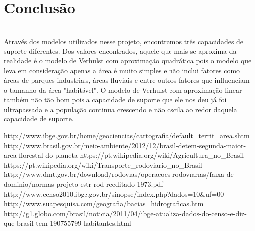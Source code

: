 \documentclass[a4paper]{article}
\begin{document}
\section{Conclus\~{a}o}
\\
Atrav\'{e}s dos modelos utilizados nesse projeto, encontramos tr\^{e}s capacidades de suporte diferentes. Dos valores encontrados, aquele que mais se aproxima da realidade \'{e} o modelo de Verhulst com aproxima\c{c}\~{a}o quadr\'{a}tica pois o modelo que leva em considera\c{c}\~{a}o apenas a \'{a}rea \'{e} muito simples e n\~{a}o inclui fatores como \'{a}reas de parques industriais, \'{a}reas fluviais e entre outros fatores que influenciam o tamanho da \'{a}rea "habit\'{a}vel". O modelo de Verhulst com aproxima\c{c}\~{a}o linear tamb\'{e}m n\~{a}o t\~{a}o bom pois a capacidade de suporte que ele nos deu j\'{a} foi ultrapassada e a popula\c{c}\~{a}o continua crescendo e n\~{a}o oscila ao redor daquela capacidade de suporte.


\begin{thebibliography}{99}
 http://www.ibge.gov.br/home/geociencias/cartografia/default\_territ\_area.shtm
 http://www.brasil.gov.br/meio-ambiente/2012/12/brasil-detem-segunda-maior-area-florestal-do-planeta 
 https://pt.wikipedia.org/wiki/Agricultura\_no\_Brasil
 https://pt.wikipedia.org/wiki/Transporte\_rodoviario\_no\_Brasil
 http://www.dnit.gov.br/download/rodovias/operacoes-rodoviarias/faixa-de-dominio/normas-projeto-estr-rod-reeditado-1973.pdf
 http://www.censo2010.ibge.gov.br/sinopse/index.php?dados=10\&uf=00
 http://www.suapesquisa.com/geografia/bacias\_hidrograficas.htm
 http://g1.globo.com/brasil/noticia/2011/04/ibge-atualiza-dados-do-censo-e-diz-que-brasil-tem-190755799-habitantes.html 
\end{thebibliography}
\end{document}
